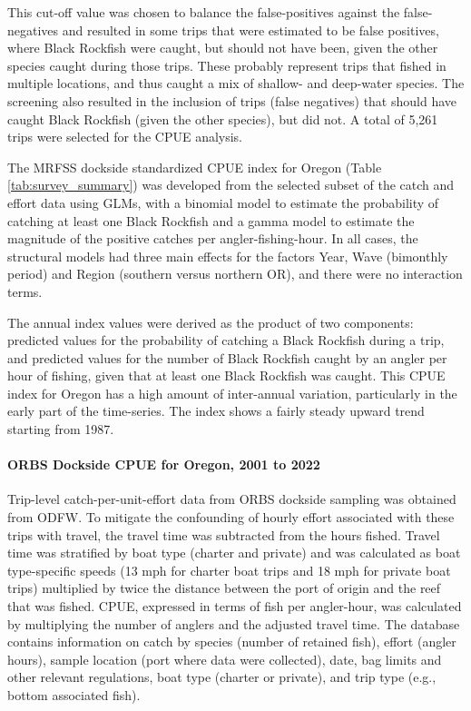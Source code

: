 \documentclass[11pt,
  english,
  letterpaper,
]{article}
\begin{document}
This cut-off value was chosen to balance the false-positives against the false-negatives and resulted in some trips that were estimated to be false positives, where Black Rockfish were caught, but should not have been, given the other species caught during those trips. These probably represent trips that fished in multiple locations, and thus caught a mix of shallow- and deep-water species. The screening also resulted in the inclusion of trips (false negatives) that should have caught Black Rockfish (given the other species), but did not. A total of 5,261 trips were selected for the CPUE analysis.

The MRFSS dockside standardized CPUE index for Oregon (Table \ref{tab:survey_summary}) was developed from the selected subset of the catch and effort data using GLMs, with a binomial model to estimate the probability of catching at least one Black Rockfish and a gamma model to estimate the magnitude of the positive catches per angler-fishing-hour. In all cases, the structural models had three main effects for the factors Year, Wave (bimonthly period) and Region (southern versus northern OR), and there were no interaction terms.

The annual index values were derived as the product of two components: predicted values for the probability of catching a Black Rockfish during a trip, and predicted values for the number of Black Rockfish caught by an angler per hour of fishing, given that at least one Black Rockfish was caught. This CPUE index for Oregon has a high amount of inter-annual variation, particularly in the early part of the time-series. The index shows a fairly steady upward trend starting from 1987.

\hypertarget{orbs-dockside-cpue-for-oregon-2001-to-2022}{%
\paragraph{ORBS Dockside CPUE for Oregon, 2001 to 2022}\label{orbs-dockside-cpue-for-oregon-2001-to-2022}}

Trip-level catch-per-unit-effort data from ORBS dockside sampling was obtained from ODFW. To mitigate the confounding of hourly effort associated with these trips with travel, the travel time was subtracted from the hours fished. Travel time was stratified by boat type (charter and private) and was calculated as boat type-specific speeds (13 mph for charter boat trips and 18 mph for private boat trips) multiplied by twice the distance between the port of origin and the reef that was fished. CPUE, expressed in terms of fish per angler-hour, was calculated by multiplying the number of anglers and the adjusted travel time. The database contains information on catch by species (number of retained fish), effort (angler hours), sample location (port where data were collected), date, bag limits and other relevant regulations, boat type (charter or private), and trip type (e.g., bottom associated fish).
\end{document}
